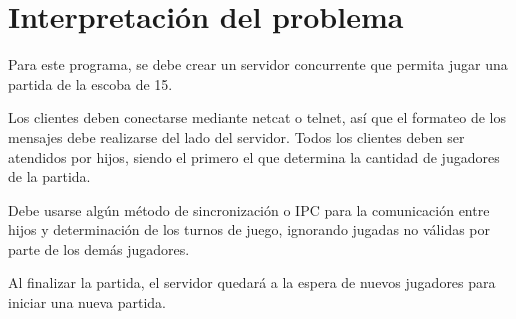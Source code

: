 \section{Interpretación del problema}
Para este programa, se debe crear un servidor concurrente que permita jugar una partida de la escoba de 15.

Los clientes deben conectarse mediante netcat o telnet, así que el formateo de los mensajes debe realizarse del lado del servidor. Todos los clientes deben ser atendidos por hijos, siendo el primero el que determina la cantidad de jugadores de la partida.

Debe usarse algún método de sincronización o IPC para la comunicación entre hijos y determinación de los turnos de juego, ignorando jugadas no válidas por parte de los demás jugadores.

Al finalizar la partida, el servidor quedará a la espera de nuevos jugadores para iniciar una nueva partida.